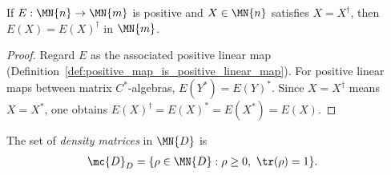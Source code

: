 \begin{theorem}
    \label{thm:positive_map_preserves_hermitian}
    \leanok
    If $E:\MN{n}\to\MN{m}$ is positive and
    $X\in\MN{n}$ satisfies $X = X^\dagger$, then
    $E(X) = E(X)^\dagger$ in $\MN{m}$.
\end{theorem}

\begin{proof}\leanok
    Regard $E$ as the associated positive linear map
    (Definition~\ref{def:positive_map_is_positive_linear_map}). For positive
    linear maps between matrix $C^*$-algebras, $E(Y^\ast)=E(Y)^\ast$.
    Since $X=X^\dagger$ means $X=X^\ast$, one obtains
    $E(X)^\dagger=E(X)^\ast=E(X^\ast)=E(X)$.
\end{proof}

\begin{definition}\label{def:density_matrices}
    \leanok
    The set of \emph{density matrices} in $\MN{D}$ is
    \begin{align}
        \mc{D}_D
         & =\{\rho \in \MN{D} : \rho \ge 0,\ \tr(\rho) = 1\}.
        \label{eq:channel_density_matrices}
    \end{align}
\end{definition}
